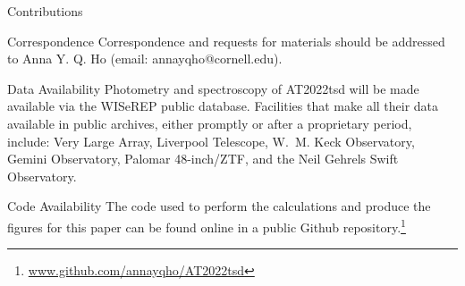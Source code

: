 \documentclass{nature_plusfigure}
\begin{document}
\begin{addendum}
\item[Contributions] 

 \item[Correspondence] Correspondence and requests for materials
should be addressed to Anna Y. Q. Ho (email: annayqho@cornell.edu).

 \item[Data Availability] Photometry and spectroscopy of AT2022tsd will be made available via the WISeREP public database. Facilities that make all their data available in public archives, either promptly or after a proprietary period, include: Very Large Array, Liverpool Telescope, W.~M. Keck Observatory, Gemini Observatory, Palomar 48-inch/ZTF, %
 and the Neil Gehrels Swift Observatory. %

 \item[Code Availability] The code used to perform the calculations and produce the figures for this paper can be found online in a public Github repository.\footnote{\url{www.github.com/annayqho/AT2022tsd}}

\end{addendum}


\clearpage
\newpage
\end{document}

